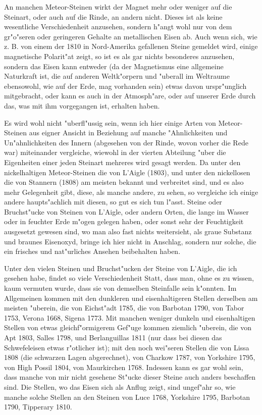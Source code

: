\documentclass[a4paper, 11pt, oneside, polutonikogreek, german]{article}
\begin{document}
An manchen Meteor-Steinen wirkt der Magnet mehr oder weniger auf die Steinart, oder auch auf die Rinde, an andern nicht. Dieses ist als keine wesentliche Verschiedenheit anzusehen, sondern h"angt wohl nur von dem gr"o"seren oder geringeren Gehalte an metallischen Eisen ab. Auch wenn sich, wie z. B. von einem der 1810 in Nord-Amerika gefallenen Steine gemeldet wird, einige magnetische Polarit"at zeigt, so ist es als gar nichts besonderes anzusehen, sondern das Eisen kann entweder (da der Magnetismus eine allgemeine Naturkraft ist, die auf anderen Weltk"orpern und "uberall im Weltraume ebensowohl, wie auf der Erde, mag vorhanden sein) etwas davon urspr"unglich mitgebracht, oder kann es auch in der Atmosph"are, oder auf unserer Erde durch das, was mit ihm vorgegangen ist, erhalten haben.

Es wird wohl nicht "uberfl"ussig sein, wenn ich hier einige Arten von Meteor-Steinen aus eigner Ansicht in Beziehung auf manche "Ahnlichkeiten und Un"ahnlichkeiten des Innern (abgesehen von der Rinde, wovon vorher die Rede war) miteinander vergleiche, wiewohl in der vierten Abteilung "uber die Eigenheiten einer jeden Steinart mehreres wird gesagt werden. Da unter den nickelhaltigen Meteor-Steinen die von L'Aigle (1803), und unter den nickellosen die von Stannern (1808) am meisten bekannt und verbreitet sind, und es also mehr Gelegenheit gibt, diese, als manche andere, zu sehen, so vergleiche ich einige andere haupts"achlich mit diesen, so gut es sich tun l"asst. Steine oder Bruchst"ucke von Steinen von L'Aigle, oder andern Orten, die lange im Wasser oder in feuchter Erde m"ogen gelegen haben, oder sonst sehr der Feuchtigkeit ausgesetzt gewesen sind, wo man also fast nichts weitersieht, als graue Substanz und braunes Eisenoxyd, bringe ich hier nicht in Anschlag, sondern nur solche, die ein frisches und nat"urliches Ansehen beibehalten haben.

Unter den vielen Steinen und Bruchst"ucken der Steine von L'Aigle, die ich gesehen habe, findet so viele Verschiedenheit Statt, dass man, ohne es zu wissen, kaum vermuten wurde, dass sie von demselben Steinfalle sein k"onnten. Im Allgemeinen kommen mit den dunkleren und eisenhaltigeren Stellen derselben am meisten "uberein, die von Eichst"adt 1785, die von Barbotan 1790, von Tabor 1753, Verona 1668, Sigena 1773. Mit manchen weniger dunkeln und eisenhaltigen Stellen von etwas gleichf"ormigerem Gef"uge kommen ziemlich "uberein, die von Apt 1803, Salles 1798, und Berlanguillas 1811 (nur dass bei diesen das Schwefeleisen etwas r"otlicher ist); mit den noch wei"seren Stellen die von Lissa 1808 (die schwarzen Lagen abgerechnet), von Charkow 1787, von Yorkshire 1795, von High Possil 1804, von Maurkirchen 1768. Indessen kann es gar wohl sein, dass manche von mir nicht gesehene St"ucke dieser Steine auch anders beschaffen sind. Die Stellen, wo das Eisen sich als Anflug zeigt, sind ungef"ahr so, wie manche solche Stellen an den Steinen von Luce 1768, Yorkshire 1795, Barbotan 1790, Tipperary 1810.
\end{document}
